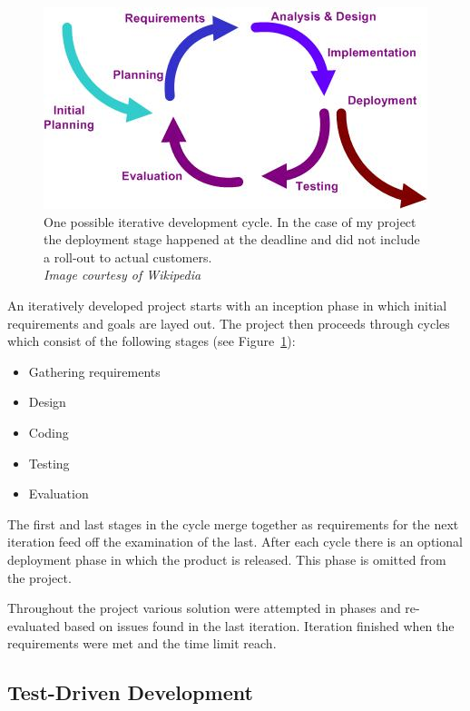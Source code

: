 \documentclass[
    12pt,
    a4paper,
    twoside,
    openright,
    ]{scrbook}
\begin{document}
\begin{figure}
  \centering
  \includegraphics{./figs/Iterative_development_model_V2.jpg}
  \caption{One possible iterative development cycle. In the case of my project
    the deployment stage happened at the deadline and did not include a roll-out
    to actual customers. \\ \emph{Image courtesy of Wikipedia}}
  \label{fig:iterative}
\end{figure}

An iteratively developed project starts with an inception phase in which initial
requirements and goals are layed out. The project then proceeds through cycles
which consist of the following stages (see Figure~\ref{fig:iterative}):

\begin{itemize}
\item
  Gathering requirements
\item
  Design
\item
  Coding
\item
  Testing
\item
  Evaluation
\end{itemize}

The first and last stages in the cycle merge together as requirements for the
next iteration feed off the examination of the last. After each cycle there is
an optional deployment phase in which the product is released. This phase is
omitted from the project.

Throughout the project various solution were attempted in phases and
re-evaluated based on issues found in the last iteration.  Iteration finished
when the requirements were met and the time limit reach.

\subsection{Test-Driven Development}
\label{sec:tdd}
\end{document}

